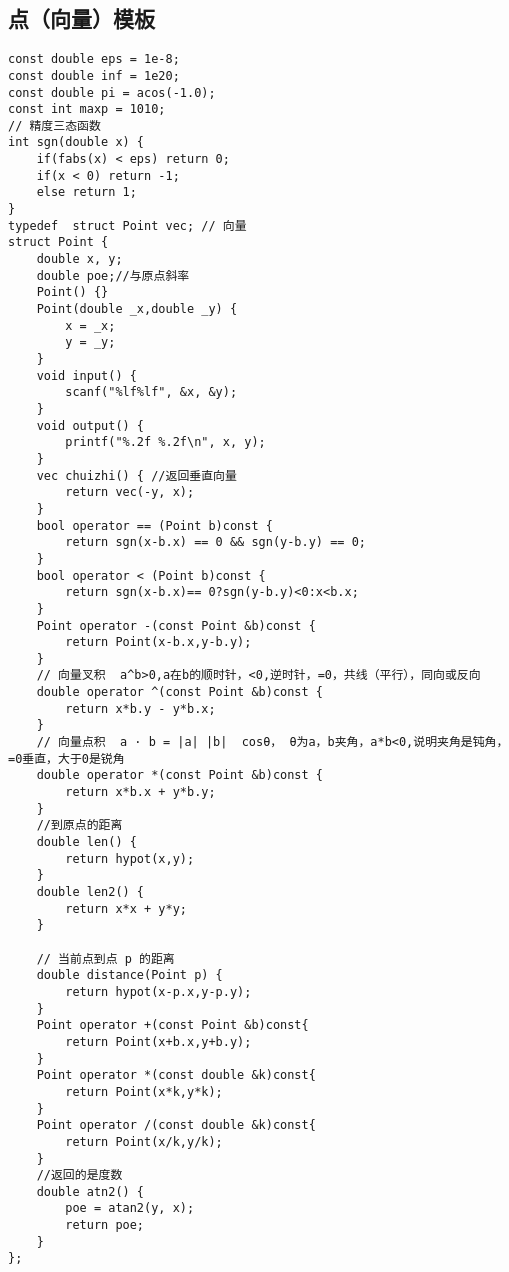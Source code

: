 \subsection{点（向量）模板}
\begin{lstlisting}
const double eps = 1e-8;
const double inf = 1e20;
const double pi = acos(-1.0);
const int maxp = 1010;
// 精度三态函数
int sgn(double x) {
	if(fabs(x) < eps) return 0;
	if(x < 0) return -1;
	else return 1;
}
typedef  struct Point vec; // 向量
struct Point {
	double x, y;
	double poe;//与原点斜率
	Point() {}
	Point(double _x,double _y) {
		x = _x;
		y = _y;
	}
	void input() {
		scanf("%lf%lf", &x, &y);
	}
	void output() {
		printf("%.2f %.2f\n", x, y);
	}
	vec chuizhi() { //返回垂直向量
		return vec(-y, x);
	}
	bool operator == (Point b)const {
		return sgn(x-b.x) == 0 && sgn(y-b.y) == 0;
	}
	bool operator < (Point b)const {
		return sgn(x-b.x)== 0?sgn(y-b.y)<0:x<b.x;
	}
	Point operator -(const Point &b)const {
		return Point(x-b.x,y-b.y);
	}
	// 向量叉积  a^b>0,a在b的顺时针，<0,逆时针，=0，共线（平行），同向或反向
	double operator ^(const Point &b)const {
		return x*b.y - y*b.x;
	}
	// 向量点积  a · b = |a| |b|  cosθ， θ为a，b夹角，a*b<0,说明夹角是钝角，=0垂直，大于0是锐角
	double operator *(const Point &b)const {
		return x*b.x + y*b.y;
	}
	//到原点的距离
	double len() {
		return hypot(x,y);
	}
	double len2() {
		return x*x + y*y;
	}

	// 当前点到点 p 的距离
	double distance(Point p) {
		return hypot(x-p.x,y-p.y);
	}
	Point operator +(const Point &b)const{
		return Point(x+b.x,y+b.y);
	}
	Point operator *(const double &k)const{
		return Point(x*k,y*k);
	}
	Point operator /(const double &k)const{
		return Point(x/k,y/k);
	}
	//返回的是度数
	double atn2() {
		poe = atan2(y, x);
		return poe;
	}
};
\end{lstlisting}


